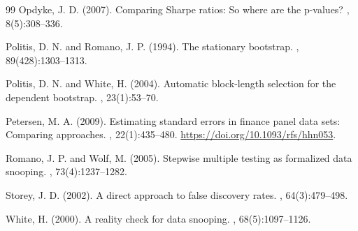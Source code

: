 \documentclass[12pt,a4paper]{article}
\begin{document}
\begin{thebibliography}{99}
Opdyke, J. D. (2007).
\newblock Comparing Sharpe ratios: So where are the p-values?
, 8(5):308--336.

Politis, D. N. and Romano, J. P. (1994).
\newblock The stationary bootstrap.
, 89(428):1303--1313.

Politis, D. N. and White, H. (2004).
\newblock Automatic block-length selection for the dependent bootstrap.
, 23(1):53--70.

Petersen, M. A. (2009).
\newblock Estimating standard errors in finance panel data sets: Comparing approaches.
, 22(1):435--480.
\newblock \url{https://doi.org/10.1093/rfs/hhn053}.

Romano, J. P. and Wolf, M. (2005).
\newblock Stepwise multiple testing as formalized data snooping.
, 73(4):1237--1282.

Storey, J. D. (2002).
\newblock A direct approach to false discovery rates.
, 64(3):479--498.

White, H. (2000).
\newblock A reality check for data snooping.
, 68(5):1097--1126.

\end{thebibliography}
\end{document}
